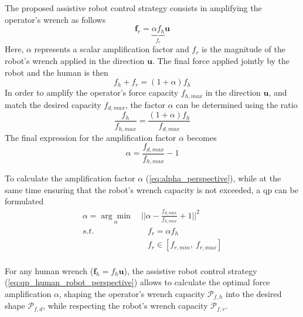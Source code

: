 The proposed assistive robot control strategy consists in amplifying the operator's wrench as follows
\begin{equation}
\bm{f}_r = \underbrace{\alpha f_h}_{f_r}\bm{u}
\label{eq:force_amp_perspective}
\end{equation}
Here, $\alpha$ represents a scalar amplification factor and $f_r$ is the magnitude of the robot's wrench applied in the direction $\bm{u}$. 
The final force applied jointly by the robot and the human is then
\begin{equation}
f_h + f_r = (1+\alpha)f_h
\end{equation}
In order to amplify the operator's force capacity $f_{h,max}$ in the direction $\bm{u}$, and match the desired capacity $f_{d,max}$, the factor $\alpha$ can be determined using the ratio
\begin{equation}
\frac{f_{h}}{f_{h,max}} = \frac{(1 + \alpha) f_h}{f_{d,max}}
\end{equation}
The final expression for the amplification factor $\alpha$ becomes
\begin{equation}
\alpha = \frac{f_{d,max}}{f_{h,max}}-1
\label{eq:alpha_perspective}
\end{equation}

To calculate the amplification factor $\alpha$ (\ref{eq:alpha_perspective}), while at the same time ensuring that the robot's wrench capacity is not exceeded, a \gls{qp} can be formulated
\begin{equation}
    \begin{split}
        \alpha =\underset{\alpha}{\arg\min} &~\Big|\Big|\alpha- \frac{f_{d,max}}{f_{h,max}}+1\Big|\Big|^2\\
        s.t.& \quad f_r  = \alpha f_h\\
        & \quad f_r \in[f_{r,min}, ~f_{r,max}]\\
    \end{split}
    \label{eq:qp_human_robot_perspective}
\end{equation}

For any human wrench ($\bm{f}_h=f_h\bm{u}$), the assistive robot control strategy (\ref{eq:qp_human_robot_perspective}) allows to calculate the optimal force amplification $\alpha$, shaping the operator's wrench capacity $\mathcal{P}_{f,h}$ into the desired shape $\mathcal{P}_{f,d}$, while respecting the robot's wrench capacity $\mathcal{P}_{f,r}$. 

